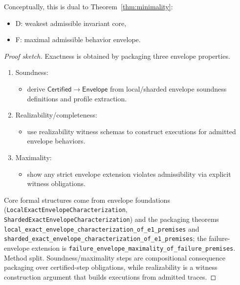 \documentclass[a4paper,10pt,twocolumn,english]{article}
\numberwithin{equation}{section}
\theoremstyle{paperdef}
\theoremstyle{paperplain}
\theoremstyle{paperdef}
\theoremstyle{paperremark}
\theoremstyle{paperdef}
\begin{document}
Conceptually, this is dual to Theorem~\ref{thm:minimality}:
\begin{itemize}
	\item D: weakest admissible invariant core,
	\item F: maximal admissible behavior envelope.
\end{itemize}

\begin{proof}[Proof sketch]
	Exactness is obtained by packaging three envelope properties.

	\begin{enumerate}
		\item Soundness:
		      \begin{itemize}
			      \item derive $\mathsf{Certified} \to \mathsf{Envelope}$ from local/sharded envelope soundness definitions and profile extraction.
		      \end{itemize}
		\item Realizability/completeness:
		      \begin{itemize}
			      \item use realizability witness schemas to construct executions for admitted envelope behaviors.
		      \end{itemize}
		\item Maximality:
		      \begin{itemize}
			      \item show any strict envelope extension violates admissibility via explicit witness obligations.
		      \end{itemize}
	\end{enumerate}

	Core formal structures come from envelope foundations (\texttt{LocalExactEnvelopeCharacterization}, \texttt{ShardedExactEnvelopeCharacterization}) and the packaging theorems \nolinkurl{local_exact_envelope_characterization_of_e1_premises} and \nolinkurl{sharded_exact_envelope_characterization_of_e1_premises}; the failure-envelope extension is \nolinkurl{failure_envelope_maximality_of_failure_premises}.
	Method split. Soundness/maximality steps are compositional consequence
	packaging over certified-step obligations, while realizability is a witness
	construction argument that builds executions from admitted traces.
\end{proof}
\end{document}

